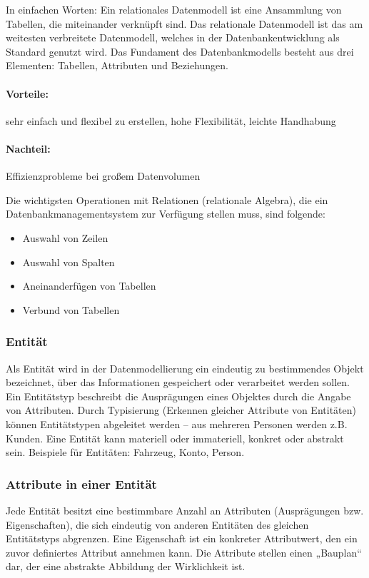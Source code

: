 In einfachen Worten: Ein relationales Datenmodell ist eine Ansammlung von Tabellen, die miteinander verknüpft sind.
Das relationale Datenmodell ist das am weitesten verbreitete Datenmodell, welches in der Datenbankentwicklung als Standard genutzt wird. Das Fundament des Datenbankmodells besteht aus drei Elementen: Tabellen, Attributen und Beziehungen.

\paragraph{Vorteile:} sehr einfach und flexibel zu erstellen, hohe Flexibilität, leichte Handhabung
\paragraph{Nachteil:} Effizienzprobleme bei großem Datenvolumen

Die wichtigsten Operationen mit Relationen (relationale Algebra), die ein Datenbankmanagementsystem zur Verfügung stellen muss, sind folgende:

\begin{itemize}
    \item Auswahl von Zeilen
    \item Auswahl von Spalten
    \item Aneinanderfügen von Tabellen
    \item Verbund von Tabellen
\end{itemize}

\subsubsection{Entität}

Als Entität wird in der Datenmodellierung ein eindeutig zu bestimmendes Objekt bezeichnet, über das Informationen gespeichert oder verarbeitet werden sollen. Ein Entitätstyp beschreibt die Ausprägungen eines Objektes durch die Angabe von Attributen. Durch Typisierung (Erkennen gleicher Attribute von Entitäten) können Entitätstypen abgeleitet werden – aus mehreren Personen werden z.B. Kunden. Eine Entität kann materiell oder immateriell, konkret oder abstrakt sein. Beispiele für Entitäten: Fahrzeug, Konto, Person.

\subsubsection{Attribute in einer Entität}

Jede Entität besitzt eine bestimmbare Anzahl an Attributen (Ausprägungen bzw. Eigenschaften), die sich eindeutig von anderen Entitäten des gleichen Entitätstyps abgrenzen. Eine Eigenschaft ist ein konkreter Attributwert, den ein zuvor definiertes Attribut annehmen kann. Die Attribute stellen einen „Bauplan“ dar, der eine abstrakte Abbildung der Wirklichkeit ist.

